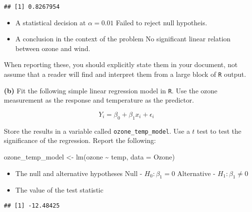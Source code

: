 \documentclass[
]{article}
\newenvironment{Shaded}{\begin{snugshade}}{\end{snugshade}}
\newcommand{\AttributeTok}[1]{\textcolor[rgb]{0.77,0.63,0.00}{#1}}
\newcommand{\DecValTok}[1]{\textcolor[rgb]{0.00,0.00,0.81}{#1}}
\newcommand{\FunctionTok}[1]{\textcolor[rgb]{0.00,0.00,0.00}{#1}}
\newcommand{\NormalTok}[1]{#1}
\newcommand{\OtherTok}[1]{\textcolor[rgb]{0.56,0.35,0.01}{#1}}
\newcommand{\SpecialCharTok}[1]{\textcolor[rgb]{0.00,0.00,0.00}{#1}}
\begin{document}
\begin{verbatim}
## [1] 0.8267954
\end{verbatim}

\begin{itemize}
\item
  A statistical decision at \(\alpha = 0.01\) Failed to reject null
  hypotheis.
\item
  A conclusion in the context of the problem No significant linear
  relation between ozone and wind.
\end{itemize}

When reporting these, you should explicitly state them in your document,
not assume that a reader will find and interpret them from a large block
of \texttt{R} output.

\textbf{(b)} Fit the following simple linear regression model in
\texttt{R}. Use the ozone measurement as the response and temperature as
the predictor.

\[
Y_i = \beta_0 + \beta_1 x_i + \epsilon_i
\]

Store the results in a variable called \texttt{ozone\_temp\_model}. Use
a \(t\) test to test the significance of the regression. Report the
following:

\begin{Shaded}
\begin{Highlighting}[]
\NormalTok{ozone\_temp\_model }\OtherTok{\textless{}{-}} \FunctionTok{lm}\NormalTok{(ozone }\SpecialCharTok{\textasciitilde{}}\NormalTok{ temp, }\AttributeTok{data =}\NormalTok{ Ozone)}
\end{Highlighting}
\end{Shaded}

\begin{itemize}
\item
  The null and alternative hypotheses Null - \(H_0: \beta_1 = 0\)
  Alternative - \(H_1: \beta_1 \neq 0\)
\item
  The value of the test statistic
\end{itemize}

\begin{Shaded}
\end{Shaded}

\begin{verbatim}
## [1] -12.48425
\end{verbatim}
\end{document}

